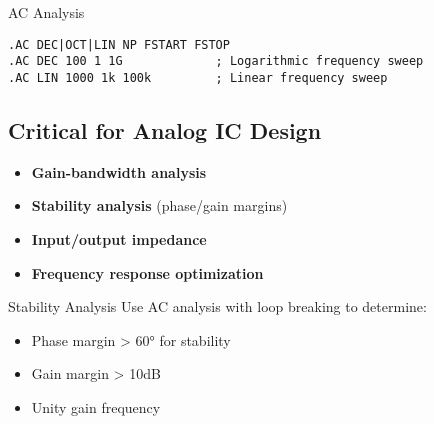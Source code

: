 \documentclass{beamer}
\begin{document}
\begin{frame}{AC Analysis}
    \begin{lstlisting}
.AC DEC|OCT|LIN NP FSTART FSTOP
.AC DEC 100 1 1G             ; Logarithmic frequency sweep
.AC LIN 1000 1k 100k         ; Linear frequency sweep
    \end{lstlisting}
    
    \subsection{Critical for Analog IC Design}
    \begin{itemize}
        \item \textbf{Gain-bandwidth analysis}
        \item \textbf{Stability analysis} (phase/gain margins)
        \item \textbf{Input/output impedance}
        \item \textbf{Frequency response optimization}
    \end{itemize}
    
    \begin{exampleblock}{Stability Analysis}
        Use AC analysis with loop breaking to determine:
        \begin{itemize}
            \item Phase margin > 60° for stability
            \item Gain margin > 10dB
            \item Unity gain frequency
        \end{itemize}
    \end{exampleblock}
\end{frame}
\end{document}
